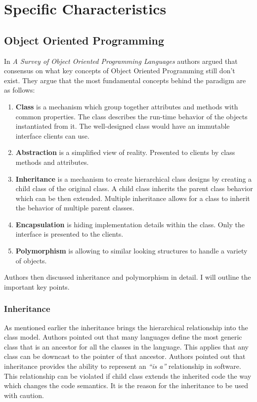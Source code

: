 \documentclass[12pt,twoside,a4paper]{report}
\begin{document}
\section{Specific Characteristics}\label{2.3}

\subsection{Object Oriented Programming}\label{2.3.1}
In \emph{A Survey of Object Oriented Programming Languages}\cite{13} authors argued that consensus on what key concepts of Object Oriented Programming still don't exist. They argue that the most fundamental concepts behind the paradigm are as follows:
\begin{enumerate}\itemsep1pt \parskip0pt 
\item \textbf{Class} is a mechanism which group together attributes and methods with common properties. The class describes the run-time behavior of the objects instantiated from it. The well-designed class would have an immutable interface clients can use.
\item \textbf{Abstraction} is a simplified view of reality. Presented to clients by class methods and attributes.
\item \textbf{Inheritance} is a mechanism to create hierarchical class designs by creating a child class of the original class. A child class inherits the parent class behavior which can be then extended. Multiple inheritance allows for a class to inherit the behavior of multiple parent classes.
\item \textbf{Encapsulation} is hiding implementation details within the class. Only the interface is presented to the
clients.
\item \textbf{Polymorphism} is allowing to similar looking structures to handle a variety of objects.
\end{enumerate}
Authors then discussed inheritance and polymorphism in detail. I will outline the important key points.

\subsubsection{Inheritance}
As mentioned earlier the inheritance brings the hierarchical relationship into the class model. Authors pointed out that many languages define the most generic class that is an ancestor for all the classes in the language. This applies that any class can be downcast to the pointer of that ancestor. Authors pointed out that inheritance provides the ability to represent an \textit{“is a”} relationship in software. This relationship can be violated if child class extends the inherited code the way which changes the code semantics. It is the reason for the inheritance to be used with caution.
\end{document}
